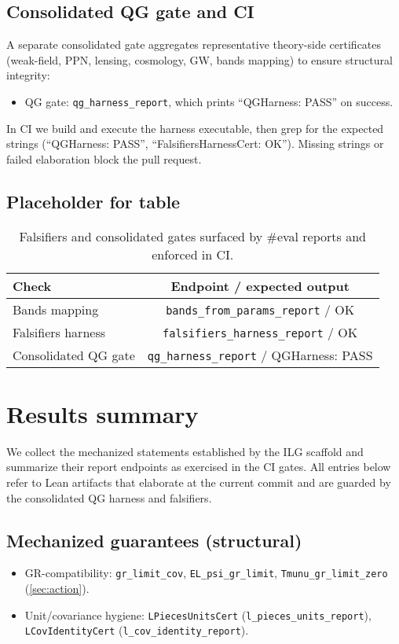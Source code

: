 \documentclass[aps,prd,twocolumn,superscriptaddress,nofootinbib,floatfix,longbibliography]{revtex4-2}
\newcommand{\lean}[1]{\texttt{#1}}
\begin{document}
\subsection{Consolidated QG gate and CI}
A separate consolidated gate aggregates representative theory-side certificates (weak-field, PPN, lensing, cosmology, GW, bands mapping) to ensure structural integrity:
\begin{itemize}
  \item QG gate: \lean{qg_harness_report}, which prints ``QGHarness: PASS'' on success.
\end{itemize}
In CI we build and execute the harness executable, then grep for the expected strings (``QGHarness: PASS'', ``FalsifiersHarnessCert: OK''). Missing strings or failed elaboration block the pull request.

\subsection{Placeholder for table}
\begin{table}[t]
  \centering
  \begin{tabular}{l c}
    \toprule
    Check & Endpoint / expected output \\
    \midrule
    Bands mapping & \texttt{bands\_from\_params\_report} / OK \\
    Falsifiers harness & \texttt{falsifiers\_harness\_report} / OK \\
    Consolidated QG gate & \texttt{qg\_harness\_report} / QGHarness: PASS \\
    \bottomrule
  \end{tabular}
  \caption{Falsifiers and consolidated gates surfaced by \#eval reports and enforced in CI.}
  \label{tab:falsifiers-endpoints}
\end{table}

\section{Results summary}\label{sec:results}

We collect the mechanized statements established by the ILG scaffold and summarize their report endpoints as exercised in the CI gates. All entries below refer to Lean artifacts that elaborate at the current commit and are guarded by the consolidated QG harness and falsifiers.

\subsection{Mechanized guarantees (structural)}
\begin{itemize}
  \item GR-compatibility: \lean{gr_limit_cov}, \lean{EL_psi_gr_limit}, \lean{Tmunu_gr_limit_zero} (\cref{sec:action}).
  \item Unit/covariance hygiene: \lean{LPiecesUnitsCert} (\lean{l_pieces_units_report}), \lean{LCovIdentityCert} (\lean{l_cov_identity_report}).
\end{itemize}
\end{document}
